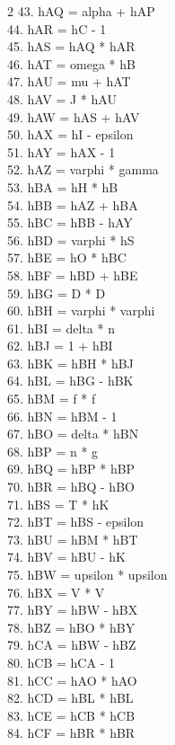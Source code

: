 \documentclass[10pt]{article}
\begin{document}
\begin{multicols}{2}
43. hAQ = alpha + hAP\\
44. hAR = hC - 1\\
45. hAS = hAQ * hAR\\
46. hAT = omega * hB\\
47. hAU = mu + hAT\\
48. hAV = J * hAU\\
49. hAW = hAS + hAV\\
50. hAX = hI - epsilon\\
51. hAY = hAX - 1\\
52. hAZ = varphi * gamma\\
53. hBA = hH * hB\\
54. hBB = hAZ + hBA\\
55. hBC = hBB - hAY\\
56. hBD = varphi * hS\\
57. hBE = hO * hBC\\
58. hBF = hBD + hBE\\
59. hBG = D * D\\
60. hBH = varphi * varphi\\
61. hBI = delta * n\\
62. hBJ = 1 + hBI\\
63. hBK = hBH * hBJ\\
64. hBL = hBG - hBK\\
65. hBM = f * f\\
66. hBN = hBM - 1\\
67. hBO = delta * hBN\\
68. hBP = n * g\\
69. hBQ = hBP * hBP\\
70. hBR = hBQ - hBO\\
71. hBS = T * hK\\
72. hBT = hBS - epsilon\\
73. hBU = hBM * hBT\\
74. hBV = hBU - hK\\
75. hBW = upsilon * upsilon\\
76. hBX = V * V\\
77. hBY = hBW - hBX\\
78. hBZ = hBO * hBY\\
79. hCA = hBW - hBZ\\
80. hCB = hCA - 1\\
81. hCC = hAO * hAO\\
82. hCD = hBL * hBL\\
83. hCE = hCB * hCB\\
84. hCF = hBR * hBR\\

\end{multicols}
\end{document}
